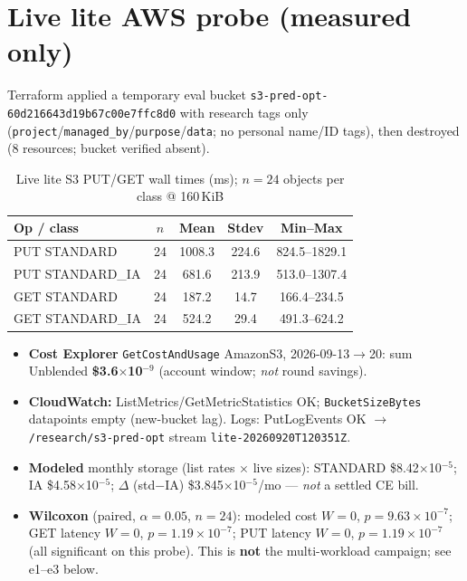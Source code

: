 \section{Live lite AWS probe (measured only)}

Terraform applied a temporary eval bucket
\texttt{s3-pred-opt-60d216643d19b67c00e7ffc8d0} with research tags only
(\texttt{project}/\texttt{managed\_by}/\texttt{purpose}/\texttt{data}; no personal name/ID tags),
then destroyed (8 resources; bucket verified absent).

\begin{table}[h]
\centering
\caption{Live lite S3 PUT/GET wall times (ms); $n{=}24$ objects per class @ 160\,KiB}
\label{tab:varun_live_lite_latency}
\begin{tabular}{lcccc}
\hline
\textbf{Op / class} & \textbf{$n$} & \textbf{Mean} & \textbf{Stdev} & \textbf{Min--Max} \\
\hline
PUT STANDARD & 24 & 1008.3 & 224.6 & 824.5--1829.1 \\
PUT STANDARD\_IA & 24 & 681.6 & 213.9 & 513.0--1307.4 \\
GET STANDARD & 24 & 187.2 & 14.7 & 166.4--234.5 \\
GET STANDARD\_IA & 24 & 524.2 & 29.4 & 491.3--624.2 \\
\hline
\end{tabular}
\end{table}

\begin{itemize}
    \item \textbf{Cost Explorer} \texttt{GetCostAndUsage} AmazonS3,
          2026-09-13$\rightarrow$20: sum Unblended \textbf{\$3.6$\times$10$^{-9}$}
          (account window; \emph{not} round savings).
    \item \textbf{CloudWatch:} ListMetrics/GetMetricStatistics OK;
          \texttt{BucketSizeBytes} datapoints empty (new-bucket lag).
          Logs: PutLogEvents OK $\rightarrow$ \texttt{/research/s3-pred-opt}
          stream \texttt{lite-20260920T120351Z}.
    \item \textbf{Modeled} monthly storage (list rates $\times$ live sizes):
          STANDARD \$8.42$\times$10$^{-5}$; IA \$4.58$\times$10$^{-5}$;
          $\Delta$ (std$-$IA) \$3.845$\times$10$^{-5}$/mo --- \emph{not} a settled CE bill.
    \item \textbf{Wilcoxon} (paired, $\alpha{=}0.05$, $n{=}24$):
          modeled cost $W{=}0$, $p{=}9.63\times10^{-7}$;
          GET latency $W{=}0$, $p{=}1.19\times10^{-7}$;
          PUT latency $W{=}0$, $p{=}1.19\times10^{-7}$
          (all significant on this probe).
          This is \textbf{not} the multi-workload campaign; see e1--e3 below.
\end{itemize}

